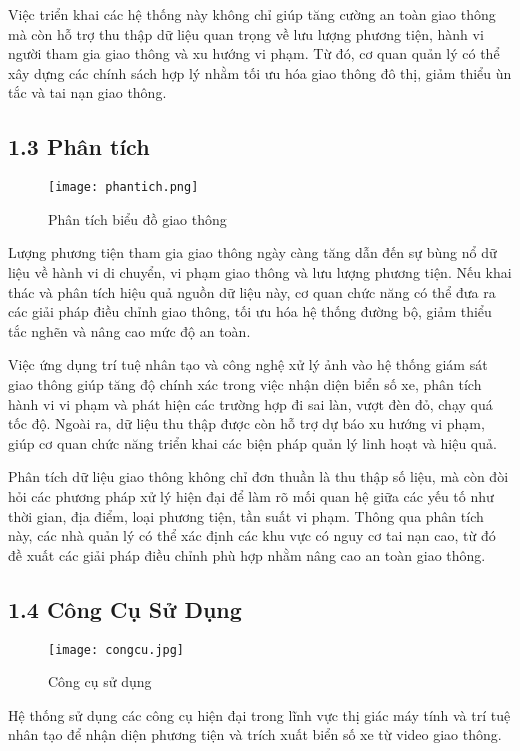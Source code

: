 \documentclass[conference]{IEEEtran}
\begin{document}
Việc triển khai các hệ thống này không chỉ giúp tăng cường an toàn giao thông mà còn hỗ trợ thu thập dữ liệu quan trọng về lưu lượng phương tiện, hành vi người tham gia giao thông và xu hướng vi phạm. Từ đó, cơ quan quản lý có thể xây dựng các chính sách hợp lý nhằm tối ưu hóa giao thông đô thị, giảm thiểu ùn tắc và tai nạn giao thông.

\subsection{1.3 Phân tích}
\begin{figure}[H]
    \centering
    \texttt{[image: phantich.png]} %
    \caption{Phân tích biểu đồ giao thông}
    \label{fig:traffic_monitoring}
\end{figure}
Lượng phương tiện tham gia giao thông ngày càng tăng dẫn đến sự bùng nổ dữ liệu về hành vi di chuyển, vi phạm giao thông và lưu lượng phương tiện. Nếu khai thác và phân tích hiệu quả nguồn dữ liệu này, cơ quan chức năng có thể đưa ra các giải pháp điều chỉnh giao thông, tối ưu hóa hệ thống đường bộ, giảm thiểu tắc nghẽn và nâng cao mức độ an toàn.

Việc ứng dụng trí tuệ nhân tạo và công nghệ xử lý ảnh vào hệ thống giám sát giao thông giúp tăng độ chính xác trong việc nhận diện biển số xe, phân tích hành vi vi phạm và phát hiện các trường hợp đi sai làn, vượt đèn đỏ, chạy quá tốc độ. Ngoài ra, dữ liệu thu thập được còn hỗ trợ dự báo xu hướng vi phạm, giúp cơ quan chức năng triển khai các biện pháp quản lý linh hoạt và hiệu quả.

Phân tích dữ liệu giao thông không chỉ đơn thuần là thu thập số liệu, mà còn đòi hỏi các phương pháp xử lý hiện đại để làm rõ mối quan hệ giữa các yếu tố như thời gian, địa điểm, loại phương tiện, tần suất vi phạm. Thông qua phân tích này, các nhà quản lý có thể xác định các khu vực có nguy cơ tai nạn cao, từ đó đề xuất các giải pháp điều chỉnh phù hợp nhằm nâng cao an toàn giao thông.

\subsection{1.4 Công Cụ Sử Dụng}
\begin{figure}[H]
    \centering
    \texttt{[image: congcu.jpg]} %
    \caption{Công cụ sử dụng}
    \label{fig:traffic_monitoring}
\end{figure}
Hệ thống sử dụng các công cụ hiện đại trong lĩnh vực thị giác máy tính và trí tuệ nhân tạo để nhận diện phương tiện và trích xuất biển số xe từ video giao thông.
\end{document}
